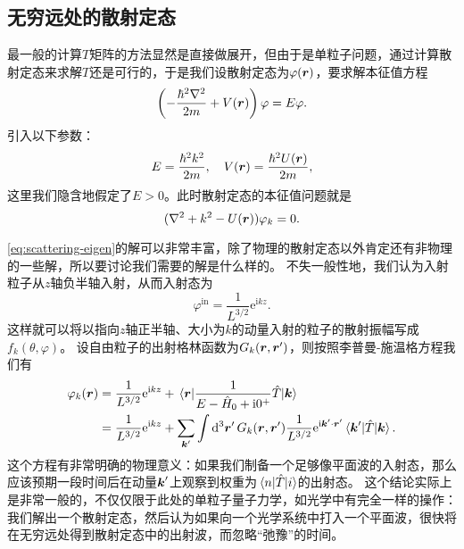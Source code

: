 \documentclass[UTF8, a4paper]{ctexart}
\newcommand*{\ee}{\mathrm{e}}
\newcommand*{\ii}{\mathrm{i}}
\begin{document}
\subsection{无穷远处的散射定态}

最一般的计算$T$矩阵的方法显然是直接做展开，但由于是单粒子问题，通过计算散射定态来求解$T$还是可行的，于是我们设散射定态为$\varphi(\vb*{r})$，要求解本征值方程
\[
    \left( - \frac{\hbar^2 \laplacian}{2m} + V(\vb*{r}) \right) \varphi = E \varphi.
\]
引入以下参数：
\begin{equation}
    E = \frac{\hbar^2 k^2}{2m}, \quad V(\vb*{r}) = \frac{\hbar^2 U(\vb*{r})}{2m},
\end{equation}
这里我们隐含地假定了$E>0$。此时散射定态的本征值问题就是
\begin{equation}
    (\laplacian + k^2 - U(\vb*{r})) \varphi_k = 0.
    \label{eq:scattering-eigen}
\end{equation}

\eqref{eq:scattering-eigen}的解可以非常丰富，除了物理的散射定态以外肯定还有非物理的一些解，所以要讨论我们需要的解是什么样的。
不失一般性地，我们认为入射粒子从$z$轴负半轴入射，从而入射态为
\[
    \varphi^\text{in} = \frac{1}{L^{3/2}} \ee^{\ii k z}.
\]
这样就可以将以指向$z$轴正半轴、大小为$k$的动量入射的粒子的散射振幅写成$f_k(\theta, \varphi)$。
设自由粒子的出射格林函数为$G_k(\vb*{r}, \vb*{r}')$，则按照李普曼-施温格方程我们有
\[
    \begin{aligned}
        \varphi_k(\vb*{r}) &= \frac{1}{L^{3/2}} \ee^{\ii k z} + \mel{\vb*{r}}{\frac{1}{E - \hat{H}_0 + \ii 0^+} \hat{T}}{\vb*{k}} \\
        &= \frac{1}{L^{3/2}} \ee^{\ii k z} + \sum_{\vb*{k}'} \int \dd[3]{\vb*{r}'} G_k(\vb*{r}, \vb*{r}') \frac{1}{L^{3/2}} \ee^{\ii \vb*{k}' \cdot \vb*{r}'} \mel*{\vb*{k}'}{\hat{T}}{\vb*{k}}.
    \end{aligned}
\]
这个方程有非常明确的物理意义：如果我们制备一个足够像平面波的入射态，那么应该预期一段时间后在动量$\vb*{k}'$上观察到权重为$\mel{n}{\hat{T}}{i}$的出射态。
这个结论实际上是非常一般的，不仅仅限于此处的单粒子量子力学，如光学中有完全一样的操作：我们解出一个散射定态，然后认为如果向一个光学系统中打入一个平面波，很快将在无穷远处得到散射定态中的出射波，而忽略“弛豫”的时间。
\end{document}

